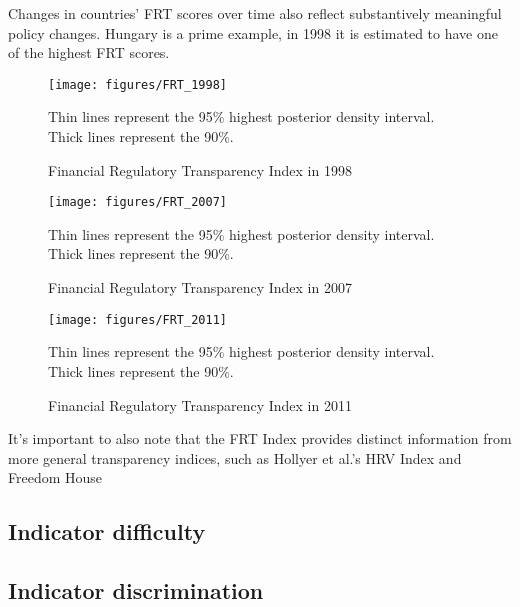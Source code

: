 \documentclass[a4paper]{article}
\begin{document}
Changes in countries' FRT scores over time also reflect substantively meaningful policy changes. Hungary is a prime example, in 1998 it is estimated to have one of the highest FRT scores. 

\begin{figure}
    \caption{Financial Regulatory Transparency Index in 1998}
    \label{FRT_1998}
    \begin{center}
        \texttt{[image: figures/FRT\_1998]}
    \end{center}
    {\scriptsize{Thin lines represent the 95\% highest posterior density interval. Thick lines represent the 90\%.}}
\end{figure}

\begin{figure}
    \caption{Financial Regulatory Transparency Index in 2007}
    \label{FRT_2007}
    \begin{center}
        \texttt{[image: figures/FRT\_2007]}
    \end{center}
    {\scriptsize{Thin lines represent the 95\% highest posterior density interval. Thick lines represent the 90\%.}}
\end{figure}

\begin{figure}
    \caption{Financial Regulatory Transparency Index in 2011}
    \label{FRT_2011}
    \begin{center}
        \texttt{[image: figures/FRT\_2011]}
    \end{center}
    {\scriptsize{Thin lines represent the 95\% highest posterior density interval. Thick lines represent the 90\%.}}
\end{figure}

It's important to also note that the FRT Index provides distinct information from more general transparency indices, such as Hollyer et al.'s HRV Index and Freedom House  


\subsection{Indicator difficulty}

\subsection{Indicator discrimination}
\end{document}
